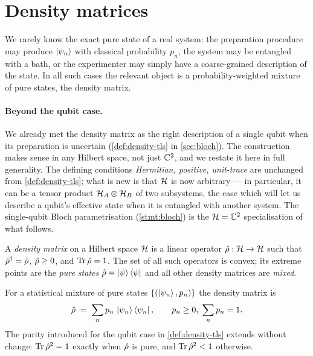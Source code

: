 \section{Density matrices}
\label{sec:density}

\begin{phenomenon}
We rarely know the exact pure state of a real system: the
preparation procedure may produce $\ket{\psi_n}$ with classical
probability $p_n$, the system may be entangled with a bath, or the
experimenter may simply have a coarse-grained description of the
state. In all such cases the relevant object is a probability-weighted
mixture of pure states, the density matrix.
\end{phenomenon}

\paragraph{Beyond the qubit case.}
We already met the density matrix as the right description of a
single qubit when its preparation is uncertain
(\cref{def:density-tls} in \cref{sec:bloch}). The construction
makes sense in any Hilbert space, not just $\mathbb{C}^2$, and we restate
it here in full generality. The defining conditions
\emph{Hermitian, positive, unit-trace} are unchanged from
\cref{def:density-tls}; what is new is that $\mathcal{H}$ is now
arbitrary --- in particular, it can be a tensor product
$\mathcal{H}_A\otimes\mathcal{H}_B$ of two subsystems, the case which
will let us describe a qubit's effective state when it is
entangled with another system. The single-qubit Bloch
parametrisation (\cref{stmt:bloch}) is the
$\mathcal{H}=\mathbb{C}^2$ specialisation of what follows.

\begin{definition}
\label{def:density}
A \emph{density matrix} on a Hilbert space $\mathcal{H}$ is a linear
operator $\hat{\rho}:\mathcal{H}\to\mathcal{H}$ such that
$\hat{\rho}^\dagger=\hat{\rho}$, $\hat{\rho}\geq 0$, and
$\operatorname{Tr}\hat{\rho}=1$. The set of all such operators is convex; its
extreme points are the \emph{pure states}
$\hat{\rho}=\ket{\psi}\bra{\psi}$ and all other density matrices are
\emph{mixed}.
\end{definition}

For a statistical mixture of pure states $\{(\ket{\psi_n},p_n)\}$ the
density matrix is
\begin{equation}
\hat{\rho} \;=\; \sum_n p_n\,\ket{\psi_n}\bra{\psi_n},
\qquad p_n\geq0,\;\sum_n p_n=1.
\end{equation}
The purity introduced for the qubit case in \cref{def:density-tls}
extends without change: $\operatorname{Tr}\hat{\rho}^2=1$ exactly when $\hat{\rho}$
is pure, and $\operatorname{Tr}\hat{\rho}^2<1$ otherwise.


